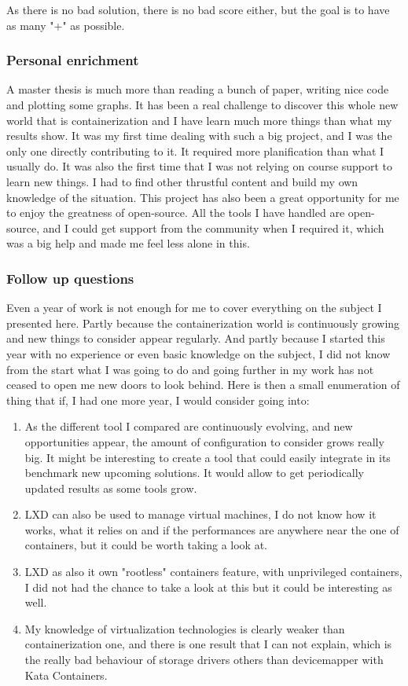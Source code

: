 As there is no bad solution, there is no bad score either, but the goal is to have as many "+" as possible.

\subsubsection{Personal enrichment}
A master thesis is much more than reading a bunch of paper, writing nice code and plotting some graphs.  It has been a real challenge to discover this whole new world that is containerization and I have learn much more things than what my results show.  It was my first time dealing with such a big project, and I was the only one directly contributing to it.  It required more planification than what I usually do.  It was also the first time that I was not relying on course support to learn new things. I had to find other thrustful content and build my own knowledge of the situation.  This project has also been a great opportunity for me to enjoy the greatness of open-source. All the tools I have handled are open-source, and I could get support from the community when I required it, which was a big help and made me feel less alone in this.

\subsubsection{Follow up questions}

Even a year of work is not enough for me to cover everything on the subject I presented here.  Partly because the containerization world is continuously growing and new things to consider appear regularly.  And partly because I started this year with no experience or even basic knowledge on the subject, I did not know from the start what I was going to do and going further in my work has not ceased to open me new doors to look behind.  Here is then a small enumeration of thing that if, I had one more year, I would consider going into:
\begin{enumerate}
  \item As the different tool I compared are continuously evolving, and new opportunities appear, the amount of configuration to consider grows really big.  It might be interesting to create a tool that could easily integrate in its benchmark new upcoming solutions.  It would allow to get periodically updated results as some tools grow.
  \item LXD can also be used to manage virtual machines, I do not know how it works, what it relies on and if the performances are anywhere near the one of containers, but it could be worth taking a look at.
  \item LXD as also it own "rootless" containers feature, with unprivileged containers, I did not had the chance to take a look at this but it could be interesting as well.
  \item My knowledge of virtualization technologies is clearly weaker than containerization one, and there is one result that I can not explain, which is the really bad behaviour of storage drivers others than devicemapper with Kata Containers.
\end{enumerate}
